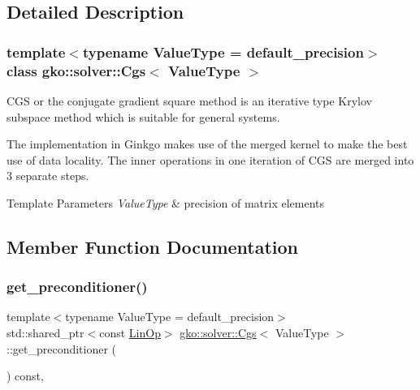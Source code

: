 \subsection{Detailed Description}
\subsubsection*{template$<$typename Value\+Type = default\+\_\+precision$>$\newline
class gko\+::solver\+::\+Cgs$<$ Value\+Type $>$}

C\+GS or the conjugate gradient square method is an iterative type Krylov subspace method which is suitable for general systems. 

The implementation in Ginkgo makes use of the merged kernel to make the best use of data locality. The inner operations in one iteration of C\+GS are merged into 3 separate steps.


\begin{DoxyTemplParams}{Template Parameters}
{\em Value\+Type} & precision of matrix elements \\
\hline
\end{DoxyTemplParams}


\subsection{Member Function Documentation}
\mbox{\label{classgko_1_1solver_1_1Cgs_ad349dc1381dfdcb7a47223908806dcc7}} 
\subsubsection{\texorpdfstring{get\+\_\+preconditioner()}{get\_preconditioner()}}
{\footnotesize\ttfamily template$<$typename Value\+Type  = default\+\_\+precision$>$ \\
std\+::shared\+\_\+ptr$<$const \hyperlink{classgko_1_1LinOp}{Lin\+Op}$>$ \hyperlink{classgko_1_1solver_1_1Cgs}{gko\+::solver\+::\+Cgs}$<$ Value\+Type $>$\+::get\+\_\+preconditioner (\begin{DoxyParamCaption}{ }\end{DoxyParamCaption}) const\hspace{0.3cm}{\ttfamily [override]}, {\ttfamily [virtual]}}




